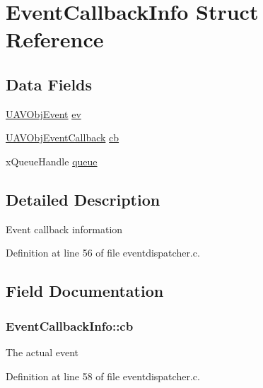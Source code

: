 \hypertarget{struct_event_callback_info}{\section{\-Event\-Callback\-Info \-Struct \-Reference}
\label{struct_event_callback_info}
}
\subsection*{\-Data \-Fields}
\begin{DoxyCompactItemize}
\item 
\hyperlink{struct_u_a_v_obj_event}{\-U\-A\-V\-Obj\-Event} \hyperlink{struct_event_callback_info_a437283aa345859ce2746a744069f63a5}{ev}
\item 
\hyperlink{targets_2_u_a_v_objects_2inc_2uavobjectmanager_8h_a33d11560e38b56dc904220fb0f785c28}{\-U\-A\-V\-Obj\-Event\-Callback} \hyperlink{struct_event_callback_info_aede25eb5852126792f5a9da9b084a32f}{cb}
\item 
x\-Queue\-Handle \hyperlink{struct_event_callback_info_a4caebba9d1c6e9e5e4c7194cec8c60a3}{queue}
\end{DoxyCompactItemize}


\subsection{\-Detailed \-Description}
\-Event callback information 

\-Definition at line 56 of file eventdispatcher.\-c.



\subsection{\-Field \-Documentation}
\hypertarget{struct_event_callback_info_aede25eb5852126792f5a9da9b084a32f}{
\subsubsection[{cb}]{ {\bf \-Event\-Callback\-Info\-::cb}}}\label{struct_event_callback_info_aede25eb5852126792f5a9da9b084a32f}
\-The actual event 

\-Definition at line 58 of file eventdispatcher.\-c.

